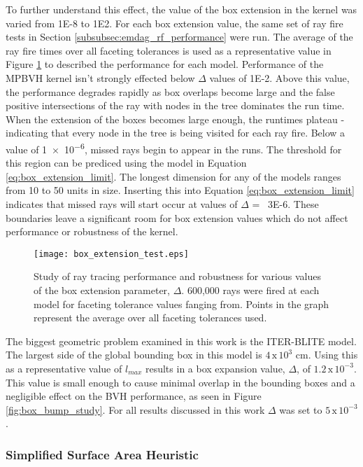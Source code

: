 To further understand this effect, the value of the box extension in the kernel
was varied from \num{1E-8} to \num{1E2}. For each box extension value, the same
set of ray fire tests in Section \ref{subsubsec:emdag_rf_performance} were
run. The average of the ray fire times over all faceting tolerances is used as a
representative value in Figure \ref{fig:box_bump_tests} to described the
performance for each model. Performance of the MPBVH kernel isn't strongly
effected below $\Delta$ values of \num{1E-2}. Above this value, the performance
degrades rapidly as box overlaps become large and the false positive
intersections of the ray with nodes in the tree dominates the run time. When the
extension of the boxes becomes large enough, the runtimes plateau - indicating
that every node in the tree is being visited for each ray fire. Below a value of
\num{1e-6}, missed rays begin to appear in the runs. The threshold for this
region can be prediced using the model in Equation
\ref{eq:box_extension_limit}. The longest dimension for any of the models ranges
from 10 to 50 units in size. Inserting this into Equation
\ref{eq:box_extension_limit} indicates that missed rays will start occur at
values of $\Delta$ = ~\num{3E-6}. These boundaries leave a significant room for
box extension values which do not affect performance or robustness of the
kernel.

\begin{figure}[H]
  \centering
  \texttt{[image: box\_extension\_test.eps]}
  \caption{Study of ray tracing performance and robustness for various values of
    the box extension parameter, $\Delta$. 600,000 rays were fired at each model
    for faceting tolerance values fanging from. Points in the graph represent
    the average over all faceting tolerances used.}
  \label{fig:box_bump_tests}
\end{figure}

The biggest geometric problem examined in this work is the ITER-BLITE model. The
largest side of the global bounding box in this model is $4 \, \text{x} \,
10^{3}$ cm. Using this as a representative value of $l_{max}$ results in a box
expansion value, $\Delta$, of $1.2 \, \text{x} \, 10^{-3}$. This value is small
enough to cause minimal overlap in the bounding boxes and a negligible effect on
the BVH performance, as seen in Figure \ref{fig:box_bump_study}. For all results
discussed in this work $\Delta$ was set to $5 \, \text{x} \, 10 ^{-3}$.

\subsubsection{Simplified Surface Area Heuristic}

